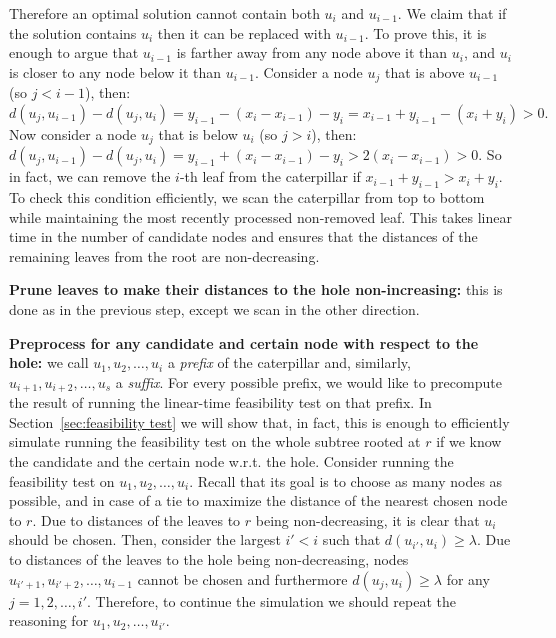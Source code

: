 \documentclass[a4paper,UKenglish]{lipics-v2016}
\newcounter{mycounter}
\newenvironment{noindlist}
 {\begin{list}{\arabic{mycounter}.~~}{\usecounter{mycounter} \labelsep=0em \labelwidth=0em \leftmargin=0em \itemindent=0em}}
 {\end{list}}
\theoremstyle{plain}
\begin{document}
\begin{noindlist}
Therefore an optimal solution cannot contain both $u_{i}$ and $u_{i-1}$. We claim that if the solution contains
$u_{i}$ then it can be replaced with $u_{i-1}$. To prove this, it is enough to argue that
$u_{i-1}$ is farther away from any node above it than $u_i$, and $u_i$ is closer to any node below it than $u_{i-1}$.
Consider a node $u_{j}$ that is above $u_{i-1}$ (so $j<i-1$), then:
$d(u_j,u_{i-1}) - d(u_j,u_{i}) = y_{i-1}-(x_i-x_{i-1})-y_i = x_{i-1}+y_{i-1}-(x_i+y_i) > 0.$
Now consider a node $u_{j}$ that is below $u_{i}$ (so $j>i$), then:
$d(u_j,u_{i-1}) - d(u_j,u_{i}) = y_{i-1}+(x_i-x_{i-1})-y_i > 2(x_i-x_{i-1}) > 0.$
So in fact, we can remove the $i$-th leaf from the caterpillar if $x_{i-1}+y_{i-1} > x_i+y_i$.
To check this condition efficiently, we scan the caterpillar from top to bottom while maintaining the most recently processed non-removed leaf.
This takes linear time in the number of candidate nodes and ensures that the distances of the
remaining leaves from the root are non-decreasing.
\item\label{making distances from the hole monotone}
\textbf{Prune leaves to make their distances to the hole non-increasing:}
this is done as in the previous step, except we scan in the other direction.
\item\label{precompute for any candidate node}
\textbf{Preprocess for any candidate and certain node with respect to the hole:}
we call $u_{1},u_{2},\ldots,u_{i}$ a {\em prefix} of the caterpillar and, similarly, $u_{i+1},u_{i+2}, \ldots,u_{s}$ a {\em suffix}.
For every possible prefix, we would like to precompute the result of running the linear-time feasibility
test on that prefix. In Section~\ref{sec:feasibility test} we will show that, in fact, this is enough to efficiently
simulate running the feasibility test on the whole subtree rooted at $r$ if we know the candidate
and the certain node w.r.t. the hole. Consider running the feasibility test on $u_{1},u_{2},\ldots,u_{i}$.
Recall that its goal is to choose as many nodes as possible, and in case of a tie to maximize the distance of the
nearest chosen node to $r$. Due to distances of the leaves to $r$ being non-decreasing, it is clear that
$u_{i}$ should be chosen. Then, consider the largest $i'<i$ such that $d(u_{i'},u_{i})\geq \lambda$.
Due to distances of the leaves to the hole
being non-decreasing, nodes $u_{i'+1},u_{i'+2},\ldots,u_{i-1}$ cannot be chosen and furthermore $d(u_{j},u_{i})\geq \lambda$
for any $j=1,2,\ldots,i'$. Therefore, to continue the simulation we should repeat the reasoning for $u_{1},u_{2},\ldots,u_{i'}$.

\end{noindlist}
\end{document}
